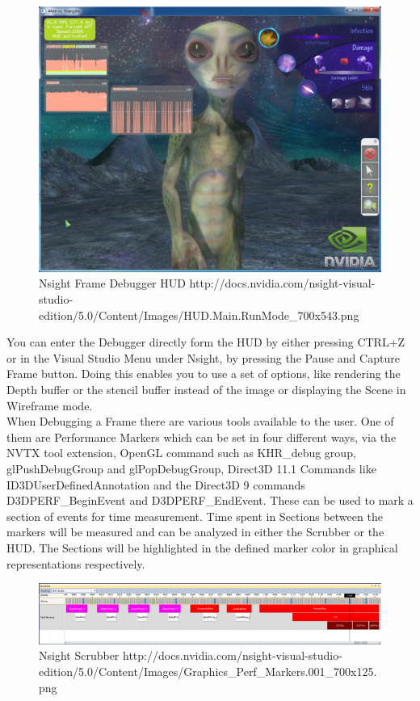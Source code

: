 \begin{figure}[htbp]
\includegraphics[scale = 0.42]{img/Nsight_HUd.png}
\caption{Nsight Frame Debugger HUD http://docs.nvidia.com/nsight-visual-studio-edition/5.0/Content/Images/HUD.Main.RunMode\_700x543.png}
\label{fig:Nsight_Hud}
\end{figure}

You can enter the Debugger directly form the HUD by either pressing CTRL+Z or in the Visual Studio Menu under Nsight, by pressing the Pause and Capture Frame button. Doing this enables you to use a set of options, like rendering the Depth buffer or the stencil buffer instead of the image or displaying the Scene in Wireframe mode.\\
When Debugging a Frame there are various tools available to the user. One of them are Performance Markers which can be set in four different ways, via the NVTX tool extension, OpenGL command such as KHR\_debug group, glPushDebugGroup and glPopDebugGroup, Direct3D 11.1 Commands like ID3DUserDefinedAnnotation and the Direct3D 9 commands D3DPERF\_BeginEvent and D3DPERF\_EndEvent. These can be used to mark a section of events for time measurement. Time spent in Sections between the markers will be measured and can be analyzed in either the Scrubber or the HUD. The Sections will be highlighted in the defined marker color in graphical representations respectively.

\begin{figure}[htbp]
\includegraphics[scale = 0.42]{img/NSight_Scrubber.png}
\caption{Nsight Scrubber http://docs.nvidia.com/nsight-visual-studio-edition/5.0/Content/Images/Graphics\_Perf\_Markers.001\_700x125.png}
\label{fig:Nsight_Scrubber}
\end{figure}

